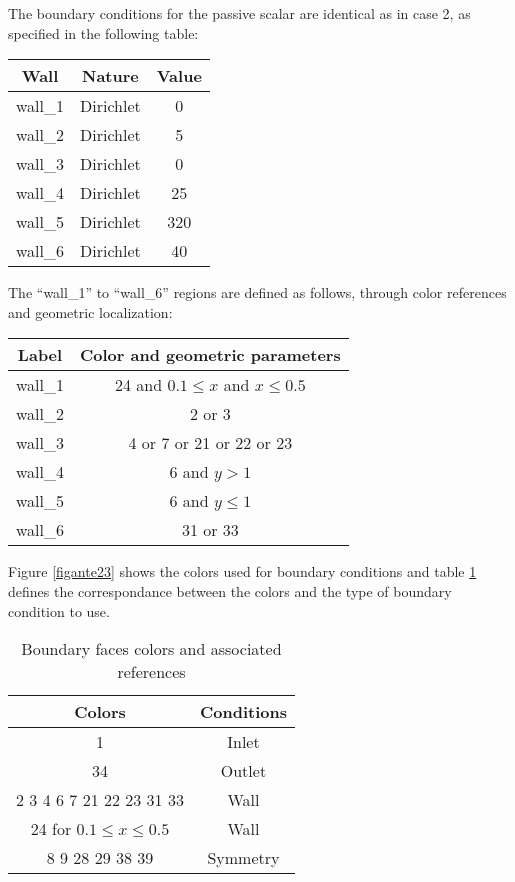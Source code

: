 The boundary conditions for the passive scalar are identical as in case 2,
as specified in the following table:

\begin{center}
\begin{tabular}{|c|c|c|}
\hline
Wall & Nature & Value \\
\hline
wall\_1 & Dirichlet  & 0 \\
\hline
wall\_2 & Dirichlet  & 5 \\
\hline
wall\_3 & Dirichlet  & 0 \\
\hline
wall\_4 & Dirichlet  & 25 \\
\hline
wall\_5 & Dirichlet  & 320 \\
\hline
wall\_6 & Dirichlet  & 40 \\
\hline
\end{tabular}
\end{center}

The ``wall\_1'' to ``wall\_6'' regions are defined as follows, through color
references and geometric localization:
\begin{center}
\begin{tabular}{|c|c|}
\hline
Label & Color and geometric parameters \\
\hline
\hline
wall\_1 & 24 and $0.1\leqslant x$ and $x\leqslant 0.5$ \\
\hline
wall\_2 & 2 or 3 \\
\hline
wall\_3 & 4 or 7 or 21 or 22 or 23 \\
\hline
wall\_4 & 6 and $y>1$ \\
\hline
wall\_5 & 6 and $y\leqslant1$ \\
\hline
wall\_6 & 31 or 33 \\
\hline
\end{tabular}
\end{center}

Figure \ref{figante23} shows the colors used for boundary conditions and
table \ref{tabante31} defines the correspondance between the colors and
the type of boundary condition to use.

\begin{table}[htp]
\begin{center}
\begin{tabular}{|c|c|}
\hline
Colors & Conditions \\
\hline
1 & Inlet \\
\hline
34 & Outlet \\
\hline
2 3 4 6 7 21 22 23 31 33 & Wall \\
\hline
24 for $0.1 \leq x \leq 0.5$ & Wall \\
\hline
8 9 28 29 38 39 & Symmetry \\
\hline
\end{tabular}
\caption{Boundary faces colors and associated references}
\label{tabante31}
\end{center}
\end{table}

